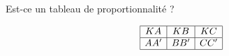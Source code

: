 

\begin{rituel}

\begin{center}
    \Large
   
\end{center}

    Est-ce un tableau de proportionnalité ?

    \begin{equation*}
        \begin{array}[]{|c|c|c|}
            \hline
            KA&KB&KC\\
            \hline
            AA'&BB'&CC'\\
            \hline
        \end{array}
    \end{equation*}
    
\end{rituel}
